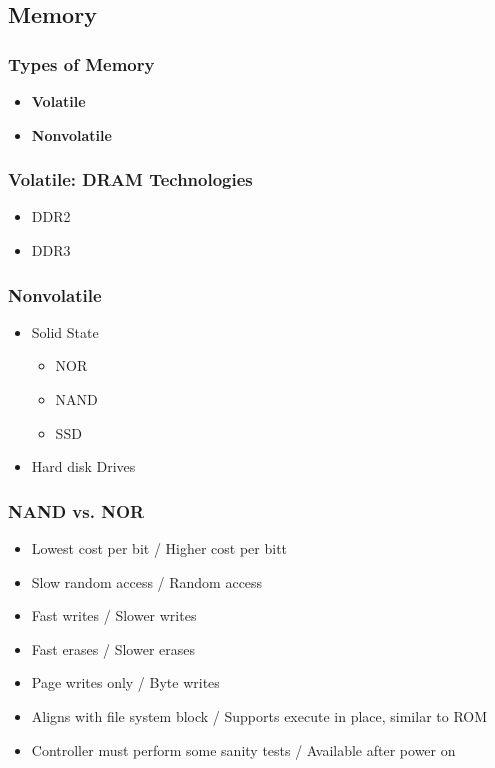 \subsection{Memory}

\begin{frame}
  \frametitle{Types of Memory}
  \begin{itemize}
  \item {\bf Volatile}
  \item {\bf Nonvolatile}
  \end{itemize}
\end{frame}


\begin{frame}
  \frametitle{Volatile: DRAM Technologies}
  \begin{itemize}
    \item DDR2
    \item DDR3
  \end{itemize}
\end{frame}

\begin{frame}
  \frametitle{Nonvolatile}
  \begin{itemize}
    \item Solid State
    \begin{itemize}
      \item NOR
      \item NAND
      \item SSD
    \end{itemize}
    \item Hard disk Drives
  \end{itemize}
\end{frame}

\begin{frame}
  \frametitle{NAND vs. NOR}
  \begin{itemize}
  \item Lowest cost per bit / Higher cost per bitt
  \item Slow random access / Random access
  \item Fast writes / Slower writes
  \item Fast erases / Slower erases
  \item Page writes only / Byte writes
  \item Aligns with file system block / Supports execute in place, similar to
  ROM
  \item Controller must perform some sanity tests / Available after power on
  \end{itemize}
\end{frame}
